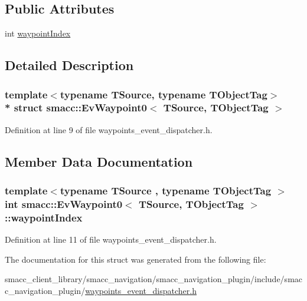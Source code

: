 \subsection*{Public Attributes}
\begin{DoxyCompactItemize}
\item 
int \hyperlink{structsmacc_1_1EvWaypoint0_a9af474f1be497c4a7c725487cfe0874b}{waypoint\+Index}
\end{DoxyCompactItemize}


\subsection{Detailed Description}
\subsubsection*{template$<$typename T\+Source, typename T\+Object\+Tag$>$\\*
struct smacc\+::\+Ev\+Waypoint0$<$ T\+Source, T\+Object\+Tag $>$}



Definition at line 9 of file waypoints\+\_\+event\+\_\+dispatcher.\+h.



\subsection{Member Data Documentation}
\subsubsection[{\texorpdfstring{waypoint\+Index}{waypointIndex}}]{\setlength{\rightskip}{0pt plus 5cm}template$<$typename T\+Source , typename T\+Object\+Tag $>$ int {\bf smacc\+::\+Ev\+Waypoint0}$<$ T\+Source, T\+Object\+Tag $>$\+::waypoint\+Index}\hypertarget{structsmacc_1_1EvWaypoint0_a9af474f1be497c4a7c725487cfe0874b}{}\label{structsmacc_1_1EvWaypoint0_a9af474f1be497c4a7c725487cfe0874b}


Definition at line 11 of file waypoints\+\_\+event\+\_\+dispatcher.\+h.



The documentation for this struct was generated from the following file\+:\begin{DoxyCompactItemize}
\item 
smacc\+\_\+client\+\_\+library/smacc\+\_\+navigation/smacc\+\_\+navigation\+\_\+plugin/include/smacc\+\_\+navigation\+\_\+plugin/\hyperlink{waypoints__event__dispatcher_8h}{waypoints\+\_\+event\+\_\+dispatcher.\+h}\end{DoxyCompactItemize}
